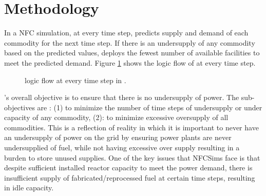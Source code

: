 \section{Methodology}
In a \Cyclus \gls{NFC} simulation, at every time step, \deploy 
predicts supply and demand of each commodity for the next time 
step. 
If there is an undersupply of any commodity based 
on the predicted values, \deploy deploys the fewest number 
of available facilities to meet the predicted demand.  
Figure \ref{fig:flow} shows the logic flow of \deploy 
at every time step. 

\begin{figure}[H]
	\centering
    \label{fig:flow}
    \caption{\Deploy logic flow at every time step in \Cyclus \cite{chee_demonstration_2019}.}
\end{figure}

\Deploy's overall objective is to ensure that there is no 
undersupply of power. 
The sub-objectives are : (1) to minimize the number of time 
steps of undersupply or under capacity of any 
commodity, (2): to minimize excessive oversupply of all commodities.
This is a reflection of reality in which it is important to 
never have an undersupply of power on the grid by ensuring power 
plants are never undersupplied of fuel, while not 
having excessive over supply resulting in a burden to store unused 
supplies. 
One of the key issues that \gls{NFCSim}s face is that despite
sufficient installed reactor capacity to meet the power 
demand, there is insufficient supply of fabricated/reprocessed 
fuel at certain time steps, resulting in idle capacity.  

